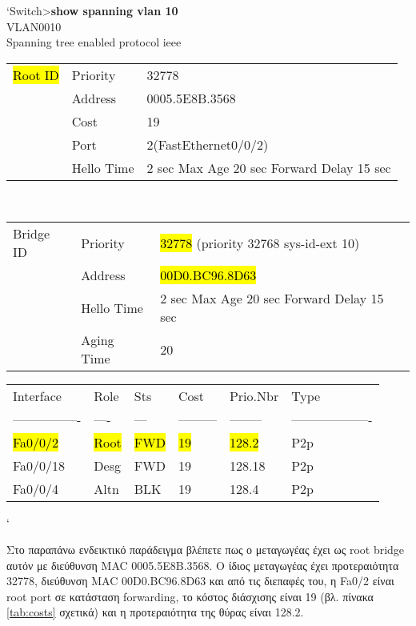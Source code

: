 \documentclass[eforms]{EdipyLabs} %
\begin{document}
\begin{CommandBox}
`Switch>\textbf{show spanning vlan 10}\\
	VLAN0010\\
	\tab[0.25cm] Spanning tree enabled protocol ieee\\[-0.25cm]
	\begin{adjustwidth}{0.25cm}{0cm}
		\begin{tabular}{lll}
			\hl{Root ID}& Priority		& 32778											\\
						& Address   	& 0005.5E8B.3568								\\
						& Cost      	& 19 											\\
						& Port      	& 2(FastEthernet0/0/2)							\\
						& Hello Time  	& 2 sec  Max Age 20 sec  Forward Delay 15 sec	\\
		\end{tabular}\\[-0.5cm]
		\begin{tabular}{lll}
			Bridge ID	& Priority		& \hl{32778} (priority 32768 sys-id-ext 10)			\\
						& Address   	& \hl{00D0.BC96.8D63}								\\
						& Hello Time  	& 2 sec  Max Age 20 sec  Forward Delay 15 sec	\\
						& Aging Time    & 20											\\
		\end{tabular}
	\end{adjustwidth}
	
	\begin{tabular}{llllll}
		Interface        & Role 		& Sts 		& Cost      & Prio.Nbr 	& Type\\
		---------------- & ---- 		& --- 		& --------- & --------  & -------------------\\
		\hl{Fa0/0/2}       & \hl{Root}	&\hl{FWD}	& \hl{19}   & \hl{128.2}& P2p\\
		Fa0/0/18           & Desg 		& FWD 		& 19        & 128.18   	& P2p\\
		Fa0/0/4            & Altn 		& BLK 		& 19        & 128.4   	& P2p
	\end{tabular}`
\end{CommandBox}

Στο παραπάνω ενδεικτικό παράδειγμα βλέπετε πως ο μεταγωγέας έχει ως root bridge αυτόν με διεύθυνση MAC 0005.5E8B.3568. Ο ίδιος μεταγωγέας έχει προτεραιότητα 32778, διεύθυνση MAC 00D0.BC96.8D63 και από τις διεπαφές του, η Fa0/2 είναι root port σε κατάσταση forwarding, το κόστος διάσχισης είναι 19 (βλ. πίνακα \ref{tab:costs} σχετικά) και η προτεραιότητα της θύρας είναι 128.2. 
\end{document}
